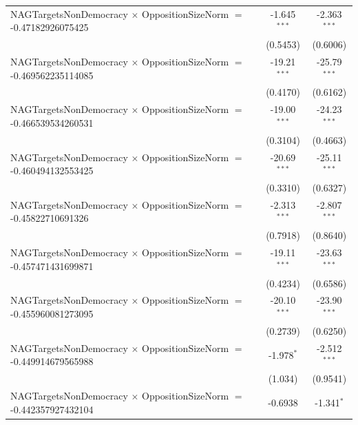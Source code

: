 \begin{tabular}{lcc}
   NAGTargetsNonDemocracy $\times$ OppositionSizeNorm $=$ -0.47182926075425     & -1.645$^{***}$       & -2.363$^{***}$\\   
                                                                                & (0.5453)             & (0.6006)\\   
   NAGTargetsNonDemocracy $\times$ OppositionSizeNorm $=$ -0.469562235114085    & -19.21$^{***}$       & -25.79$^{***}$\\   
                                                                                & (0.4170)             & (0.6162)\\   
   NAGTargetsNonDemocracy $\times$ OppositionSizeNorm $=$ -0.466539534260531    & -19.00$^{***}$       & -24.23$^{***}$\\   
                                                                                & (0.3104)             & (0.4663)\\   
   NAGTargetsNonDemocracy $\times$ OppositionSizeNorm $=$ -0.460494132553425    & -20.69$^{***}$       & -25.11$^{***}$\\   
                                                                                & (0.3310)             & (0.6327)\\   
   NAGTargetsNonDemocracy $\times$ OppositionSizeNorm $=$ -0.45822710691326     & -2.313$^{***}$       & -2.807$^{***}$\\   
                                                                                & (0.7918)             & (0.8640)\\   
   NAGTargetsNonDemocracy $\times$ OppositionSizeNorm $=$ -0.457471431699871    & -19.11$^{***}$       & -23.63$^{***}$\\   
                                                                                & (0.4234)             & (0.6586)\\   
   NAGTargetsNonDemocracy $\times$ OppositionSizeNorm $=$ -0.455960081273095    & -20.10$^{***}$       & -23.90$^{***}$\\   
                                                                                & (0.2739)             & (0.6250)\\   
   NAGTargetsNonDemocracy $\times$ OppositionSizeNorm $=$ -0.449914679565988    & -1.978$^{*}$         & -2.512$^{***}$\\   
                                                                                & (1.034)              & (0.9541)\\   
   NAGTargetsNonDemocracy $\times$ OppositionSizeNorm $=$ -0.442357927432104    & -0.6938              & -1.341$^{*}$\\   

\end{tabular}
